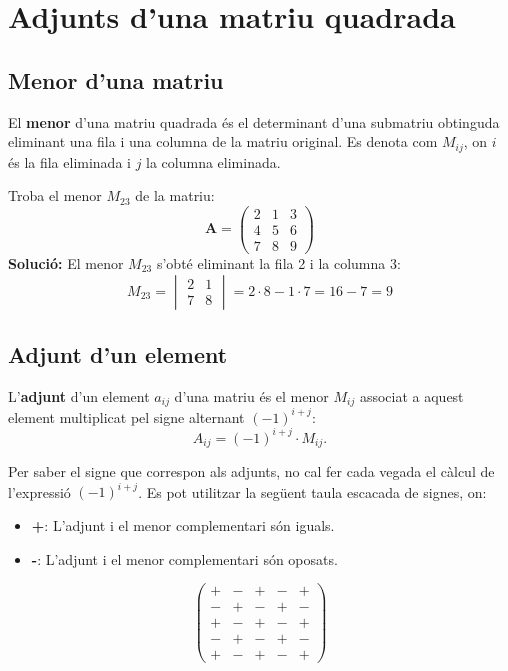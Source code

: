 \documentclass[12pt]{article}
\newcommand{\mat}[1]{\mathbf{#1}}
\begin{document}
\section{Adjunts d'una matriu quadrada}

\subsection{Menor d'una matriu}
\begin{concept}
El \textbf{menor} d'una matriu quadrada és el determinant d'una submatriu obtinguda eliminant una fila i una columna de la matriu original. Es denota com $M_{ij}$, on $i$ és la fila eliminada i $j$ la columna eliminada.
\end{concept}

\begin{exemple}
Troba el menor $M_{23}$ de la matriu:
\[
\mat{A} = \begin{pmatrix}
2 & 1 & 3 \\
4 & 5 & 6 \\
7 & 8 & 9
\end{pmatrix}
\]
\textbf{Solució:} El menor $M_{23}$ s'obté eliminant la fila 2 i la columna 3:
\[
M_{23} = \begin{vmatrix}
2 & 1 \\
7 & 8
\end{vmatrix} = 2 \cdot 8 - 1 \cdot 7 = 16 - 7 = 9
\]
\end{exemple}

\subsection{Adjunt d'un element}
\begin{concept}
L'\textbf{adjunt} d'un element $a_{ij}$ d'una matriu és el menor $M_{ij}$ associat a aquest element multiplicat pel signe alternant $(-1)^{i+j}$:
\[
A_{ij} = (-1)^{i+j} \cdot M_{ij}.
\]

Per saber el signe que correspon als adjunts, no cal fer cada vegada el càlcul de l'expressió $(-1)^{i+j}$. Es pot utilitzar la següent taula escacada de signes, on:
\begin{itemize}
    \item \textbf{+}: L'adjunt i el menor complementari són iguals.
    \item \textbf{-}: L'adjunt i el menor complementari són oposats.
\end{itemize}

\[
\begin{pmatrix}
+ & - & + & - & + \\
- & + & - & + & - \\
+ & - & + & - & + \\
- & + & - & + & - \\
+ & - & + & - & +
\end{pmatrix}
\]

\end{concept}
\end{document}

